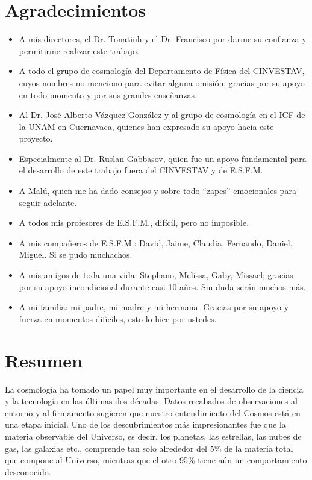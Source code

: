 \documentclass[a4paper,openright,12pt]{book}
\begin{document}
\chapter*{Agradecimientos} %
\begin{itemize}
\item A mis directores, el Dr. Tonatiuh y el Dr. Francisco por darme su confianza y permitirme realizar este trabajo.
\item A todo el grupo de cosmología del Departamento de Física del CINVESTAV, cuyos nombres no menciono para evitar alguna omisión, gracias por su apoyo en todo momento y por sus grandes enseñanzas.
\item Al Dr. José Alberto Vázquez González y al grupo de cosmología en el ICF de la UNAM en Cuernavaca, quienes han expresado su apoyo hacia este proyecto.
\item Especialmente al Dr. Ruslan Gabbasov, quien fue un apoyo fundamental para el desarrollo de este trabajo fuera del CINVESTAV y de E.S.F.M.
\item A Malú, quien me ha dado consejos y sobre todo ``zapes'' emocionales para seguir adelante.
\item A todos mis profesores de E.S.F.M., difícil, pero no imposible.
\item A mis compañeros de E.S.F.M.: David, Jaime, Claudia, Fernando, Daniel, Miguel. Si se pudo muchachos.
\item A mis amigos de toda una vida: Stephano, Melissa, Gaby, Missael; gracias por su apoyo incondicional durante casi 10 años. Sin duda serán muchos más.
\item A mi familia: mi padre, mi madre y mi hermana. Gracias por su apoyo y fuerza en momentos difíciles, esto lo hice por ustedes.
\end{itemize}



\chapter*{Resumen} %

La cosmología ha tomado un papel muy importante en el desarrollo de la ciencia y la tecnología en las últimas dos décadas. Datos recabados de observaciones al entorno y al firmamento sugieren que nuestro entendimiento del Cosmos está en una etapa inicial. Uno de los descubrimientos más impresionantes fue que la materia observable del Universo, es decir, los planetas, las estrellas, las nubes de gas, las galaxias etc., comprende tan solo alrededor del 5\% de la materia total que compone al Universo, mientras que el otro 95\% tiene aún un comportamiento desconocido.
\end{document}
